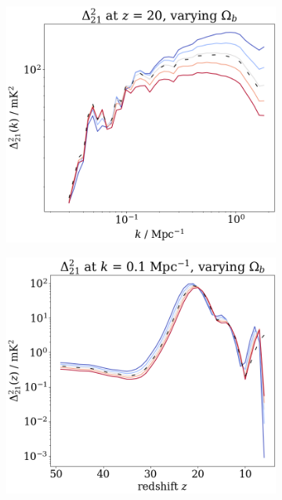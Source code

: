 \documentclass[floats,floatfix,showpacs,amssymb,prd,superscriptaddress,nofootinbib, 11pt]{revtex4-2} %
\begin{document}
\begin{figure}[H]
\begin{subfigure}[b]{0.45\textwidth}
         \centering
         \includegraphics[width=\textwidth]{images/simulation_results/power_spectrum_fixed_z_20_Ob.png}
         \label{fig:power_spectrum_fixed_z_20_Ob}
     \end{subfigure}
     \hfill
     \begin{subfigure}[b]{0.45\textwidth}
         \centering
         \includegraphics[width=\textwidth]{images/simulation_results/power_spectrum_fixed_k_0.1_Ob.png}

\end{subfigure}
\end{figure}
\end{document}
